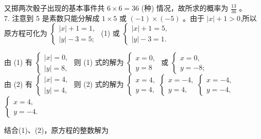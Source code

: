\documentclass[10pt]{article}
\begin{document}
又掷两次骰子出现的基本事件共 $6 \times 6=36$ (种) 情况，故所求的概率为 $\frac{13}{36}$ 。\\
7. 注意到 5 是素数只能分解成 $1 \times 5$ 或 $(-1) \times(-5)$ 。由于 $|x|+1>0$,所以原方程可化为 $\left\{\begin{array}{l}|x|+1=1, \\ |y|-3=5 ;\end{array}\right.$ (1) 或 $\left\{\begin{array}{l}|x|+1=5, \\ |y|-3=1 .\end{array}\right.$

由 (1) 有 $\left\{\begin{array}{l}|x|=0, \\ |y|=8,\end{array}\right.$ 则 (1) 式的解为 $\left\{\begin{array}{l}x=0, \\ y=8\end{array}\right.$ 或 $\left\{\begin{array}{l}x=0, \\ y=-8 ;\end{array}\right.$\\
由 (2) 有 $\left\{\begin{array}{l}|x|=4, \\ |y|=4,\end{array}\right.$ 则 (2) 式的解为 $\left\{\begin{array}{l}x=4, \\ y=4,\end{array}\left\{\begin{array}{l}x=-4, \\ y=4,\end{array}\left\{\begin{array}{l}x=-4, \\ y=-4,\end{array}\right.\right.\right.$ $\left\{\begin{array}{l}x=4, \\ y=-4 .\end{array}\right.$

结合(1)、(2)，原方程的整数解为
\end{document}
